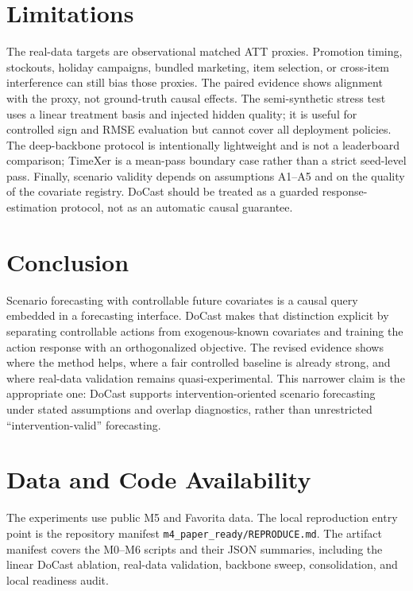 \documentclass[11pt]{article}
\begin{document}
\section{Limitations}

The real-data targets are observational matched ATT proxies. Promotion timing,
stockouts, holiday campaigns, bundled marketing, item selection, or cross-item
interference can still bias those proxies. The paired evidence shows alignment
with the proxy, not ground-truth causal effects. The semi-synthetic stress test
uses a linear treatment basis and injected hidden quality; it is useful for
controlled sign and RMSE evaluation but cannot cover all deployment policies.
The deep-backbone protocol is intentionally lightweight and is not a
leaderboard comparison; TimeXer is a mean-pass boundary case rather than a
strict seed-level pass. Finally, scenario validity depends on assumptions A1--A5
and on the quality of the covariate registry. DoCast should be treated as a
guarded response-estimation protocol, not as an automatic causal guarantee.

\section{Conclusion}

Scenario forecasting with controllable future covariates is a causal query
embedded in a forecasting interface. DoCast makes that distinction explicit by
separating controllable actions from exogenous-known covariates and training the
action response with an orthogonalized objective. The revised evidence shows
where the method helps, where a fair controlled baseline is already strong, and
where real-data validation remains quasi-experimental. This narrower claim is
the appropriate one: DoCast supports intervention-oriented scenario forecasting
under stated assumptions and overlap diagnostics, rather than unrestricted
``intervention-valid'' forecasting.

\section*{Data and Code Availability}

The experiments use public M5 and Favorita data. The local reproduction entry
point is the repository manifest \texttt{m4\_paper\_ready/REPRODUCE.md}. The
artifact manifest covers the M0--M6 scripts and their JSON summaries, including
the linear DoCast ablation, real-data validation, backbone sweep, consolidation,
and local readiness audit.
\end{document}
